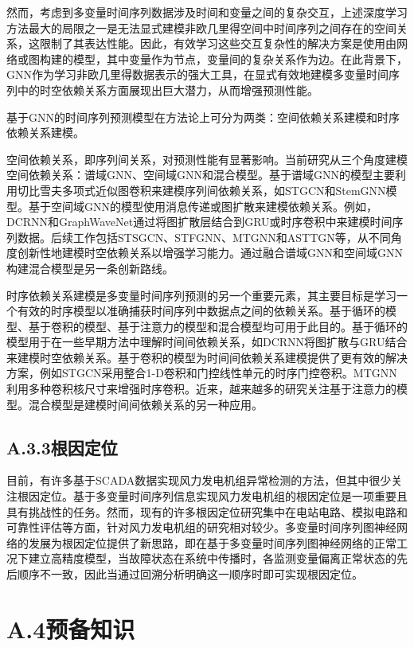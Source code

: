 然而，考虑到多变量时间序列数据涉及时间和变量之间的复杂交互，上述深度学习方法最大的局限之一是无法显式建模非欧几里得空间中时间序列之间存在的空间关系，这限制了其表达性能。因此，有效学习这些交互复杂性的解决方案是使用由网络或图构建的模型，其中变量作为节点，变量间的复杂关系作为边。在此背景下，GNN作为学习非欧几里得数据表示的强大工具，在显式有效地建模多变量时间序列中的时空依赖关系方面展现出巨大潜力，从而增强预测性能。

基于GNN的时间序列预测模型在方法论上可分为两类：空间依赖关系建模和时序依赖关系建模。

空间依赖关系，即序列间关系，对预测性能有显著影响。当前研究从三个角度建模空间依赖关系：谱域GNN、空间域GNN和混合模型。基于谱域GNN的模型主要利用切比雪夫多项式近似图卷积来建模序列间依赖关系，如STGCN和StemGNN模型。基于空间域GNN的模型使用消息传递或图扩散来建模依赖关系。例如，DCRNN和GraphWaveNet通过将图扩散层结合到GRU或时序卷积中来建模时间序列数据。后续工作包括STSGCN、STFGNN、MTGNN和ASTTGN等，从不同角度创新性地建模时空依赖关系以增强学习能力。通过融合谱域GNN和空间域GNN构建混合模型是另一条创新路线。

时序依赖关系建模是多变量时间序列预测的另一个重要元素，其主要目标是学习一个有效的时序模型以准确捕获时间序列中数据点之间的依赖关系。基于循环的模型、基于卷积的模型、基于注意力的模型和混合模型均可用于此目的。基于循环的模型用于在一些早期方法中理解时间间依赖关系，如DCRNN将图扩散与GRU结合来建模时空依赖关系。基于卷积的模型为时间间依赖关系建模提供了更有效的解决方案，例如STGCN采用整合1-D卷积和门控线性单元的时序门控卷积。MTGNN利用多种卷积核尺寸来增强时序卷积。近来，越来越多的研究关注基于注意力的模型。混合模型是建模时间间依赖关系的另一种应用。

\subsection*{A.3.3\quad 根因定位}

目前，有许多基于SCADA数据实现风力发电机组异常检测的方法，但其中很少关注根因定位。基于多变量时间序列信息实现风力发电机组的根因定位是一项重要且具有挑战性的任务。然而，现有的许多根因定位研究集中在电站电路、模拟电路和可靠性评估等方面，针对风力发电机组的研究相对较少。多变量时间序列图神经网络的发展为根因定位提供了新思路，即在基于多变量时间序列图神经网络的正常工况下建立高精度模型，当故障状态在系统中传播时，各监测变量偏离正常状态的先后顺序不一致，因此当通过回溯分析明确这一顺序时即可实现根因定位。

\section*{A.4\quad 预备知识}

